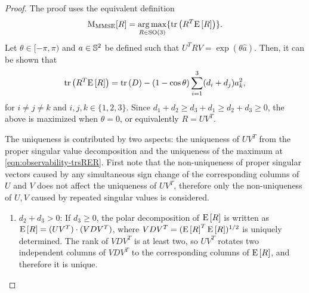 \begin{proof}
	The proof uses the equivalent definition \cite{lee2018bayesian}
	\begin{align*}
		\mathrm{M}_{\mathrm{MMSE}} [R] = \operatorname*{arg\,max}_{R\in\mathrm{SO}(3)} \{\mathrm{tr}\left( R^T\mathrm{E}\left[ R \right] \right)\}.
	\end{align*}
	Let $\theta\in[-\pi,\pi)$ and $a\in\mathbb{S}^2$ be defined such that $U^T R V = \exp(\theta\hat a)$. 
	Then, it can be shown that
	\begin{align} \label{eqn:observability-trsRER}
		\mathrm{tr}\left( R^T \mathrm{E}\left[ R \right] \right) = \mathrm{tr}\left( D \right) - (1-\cos\theta) \sum_{i=1}^3 (d_i+d_j) a_k^2,
	\end{align}
	for $i\neq j\neq k$ and $i,j,k\in\{1,2,3\}$.
	Since $d_1+d_2 \geq d_3+d_1 \geq d_2 +d_3 \geq 0$, the above is maximized when $\theta=0$, or equivalently $R= UV^T$. 
	
	The uniqueness is contributed by two aspects: the uniqueness of $UV^T$ from the proper singular value decomposition and the uniqueness of the maximum at \eqref{eqn:observability-trsRER}.
	First note that the non-uniqueness of proper singular vectors caused by any simultaneous sign change of the corresponding columns of $U$ and $V$ does not affect the uniqueness of $UV^T$, therefore only the non-uniqueness of $U,V$ caused by repeated singular values is considered.
	\begin{enumerate}
		\item $d_2+d_3 >0$:
		If $d_3\geq 0$, the polar decomposition of $\mathrm{E}\left[ R \right]$ is written as $\mathrm{E}\left[ R \right] = (UV^T) \cdot (VDV^T)$, where $VDV^T = (\mathrm{E}\left[ R \right]^T\mathrm{E}\left[ R \right])^{1/2}$ is uniquely determined.
		The rank of $VDV^T$ is at least two, so $UV^T$ rotates two independent columns of $VDV^T$ to the corresponding columns of $\mathrm{E}\left[ R \right]$, and therefore it is unique.
		

\end{enumerate}
\end{proof}
